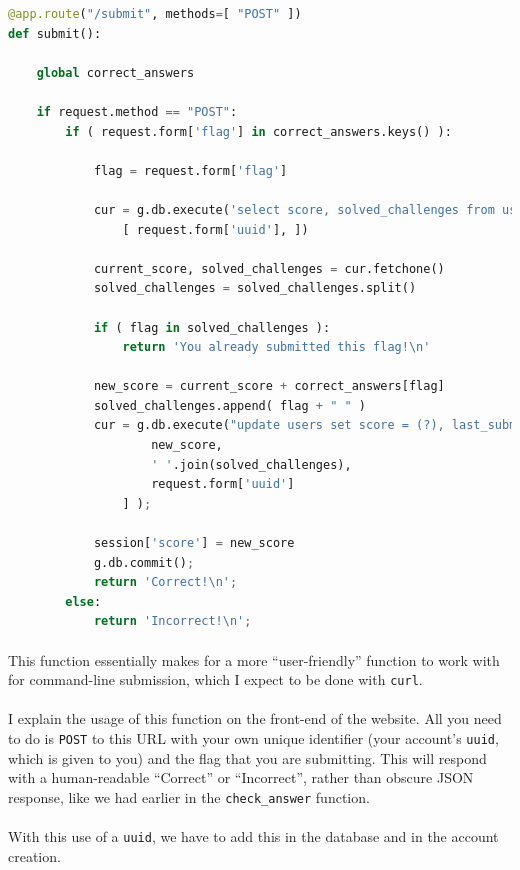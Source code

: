 \documentclass[11pt]{article}
\begin{document}
	\newpage

	\begin{lstlisting}[language=Python]
@app.route("/submit", methods=[ "POST" ])
def submit(): 

	global correct_answers

	if request.method == "POST":
		if ( request.form['flag'] in correct_answers.keys() ):

			flag = request.form['flag']

			cur = g.db.execute('select score, solved_challenges from users where uuid = (?)',
				[ request.form['uuid'], ])

			current_score, solved_challenges = cur.fetchone()
			solved_challenges = solved_challenges.split()

			if ( flag in solved_challenges ):
				return 'You already submitted this flag!\n'

			new_score = current_score + correct_answers[flag]
			solved_challenges.append( flag + " " )
			cur = g.db.execute("update users set score = (?), last_submission = (SELECT strftime('%s')), solved_challenges = (?) where uuid = (?)", [
					new_score, 
					' '.join(solved_challenges),
					request.form['uuid']
				] );

			session['score'] = new_score
			g.db.commit();
			return 'Correct!\n';
		else:
			return 'Incorrect!\n';
	\end{lstlisting}

	\paragraph{} This function essentially makes for a more ``user-friendly'' function to work with for command-line submission, which I expect to be done with \texttt{curl}. 

	\paragraph{} I explain the usage of this function on the front-end of the website. All you need to do is \texttt{POST} to this URL with your own unique identifier (your account's \texttt{uuid}, which is given to you) and the flag that you are submitting. This will respond with a human-readable ``Correct'' or ``Incorrect'', rather than obscure JSON response, like we had earlier in the \texttt{check\_answer} function.

	\newpage


	\paragraph{} With this use of a \texttt{uuid}, we have to add this in the database and in the account creation.
\end{document}
